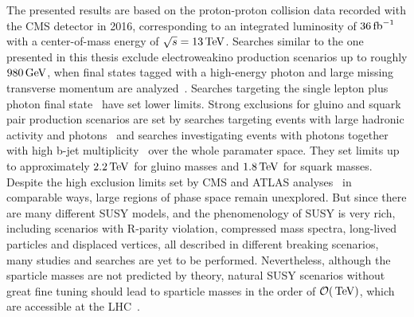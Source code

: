 The presented results are based on the proton-proton collision data recorded with the CMS detector in 2016, corresponding to an integrated luminosity of $36\mbox{\ensuremath{\,\text{fb}^\text{$-$1}}}$ with a center-of-mass energy of $\sqrt{s}=13\,\text{Te\hspace{-.08em}V}$. Searches similar to the one presented in this thesis exclude electroweakino production scenarios up to roughly $980\,\text{Ge\hspace{-.08em}V}$, when final states tagged with a high-energy photon and large missing transverse momentum are analyzed~\cite{PhotonMet}. Searches targeting the single lepton plus photon final state~\cite{PhotonLepton} have set lower limits. Strong exclusions for gluino and squark pair production scenarios are set by searches targeting events with large hadronic activity and photons~\cite{PhotonHT} and searches investigating events with photons together with high b-jet multiplicity~\cite{PhotonBJet} over the whole paramater space. They set limits up to approximately $2.2\,\text{Te\hspace{-.08em}V}$ for gluino masses and $1.8\,\text{Te\hspace{-.08em}V}$ for squark masses.\\
Despite the high exclusion limits set by CMS and ATLAS analyses~\cite{AtlasGMSB1,AtlasGMSB2,AtlasGMSB3} in comparable ways, large regions of phase space remain unexplored. But since there are many different SUSY models, and the phenomenology of SUSY is very rich, including scenarios with R-parity violation, compressed mass spectra, long-lived particles and displaced vertices, all described in different breaking scenarios, many studies and searches are yet to be performed. Nevertheless, although the sparticle masses are not predicted by theory, natural SUSY scenarios without great fine tuning should lead to sparticle masses in the order of $\mathcal{O}(\,\text{Te\hspace{-.08em}V})$, which are accessible at the LHC~\cite{SUSYNaturalStatus}.

